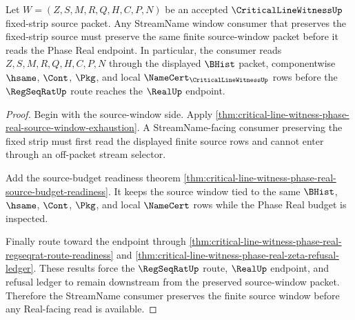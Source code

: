 \begin{theorem}
\label{thm:critical-line-witness-streamname-source-window-lock}
Let $W=(Z,S,M,R,Q,H,C,P,N)$ be an accepted $\CriticalLineWitnessUp$ fixed-strip source packet. Any StreamName window consumer that preserves the fixed-strip source must preserve the same finite source-window packet before it reads the Phase Real endpoint. In particular, the consumer reads $Z,S,M,R,Q,H,C,P,N$ through the displayed $\BHist$ packet, componentwise $\hsame$, $\Cont$, $\Pkg$, and local $\NameCert_{\CriticalLineWitnessUp}$ rows before the $\RegSeqRatUp$ route reaches the $\RealUp$ endpoint.
\end{theorem}
\begin{proof}
Begin with the source-window side. Apply \autoref{thm:critical-line-witness-phase-real-source-window-exhaustion}. A StreamName-facing consumer preserving the fixed strip must first read the displayed finite source rows and cannot enter through an off-packet stream selector.

Add the source-budget readiness theorem \autoref{thm:critical-line-witness-phase-real-source-budget-readiness}. It keeps the source window tied to the same $\BHist$, $\hsame$, $\Cont$, $\Pkg$, and local $\NameCert$ rows while the Phase Real budget is inspected.

Finally route toward the endpoint through \autoref{thm:critical-line-witness-phase-real-regseqrat-route-readiness} and \autoref{thm:critical-line-witness-phase-real-zeta-refusal-ledger}. These results force the $\RegSeqRatUp$ route, $\RealUp$ endpoint, and refusal ledger to remain downstream from the preserved source-window packet. Therefore the StreamName consumer preserves the finite source window before any Real-facing read is available.
\end{proof}

